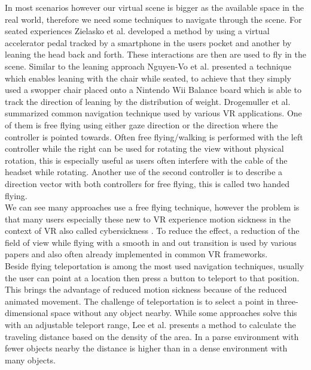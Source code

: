 In most scenarios however our virtual scene is bigger as the available space in the real world, therefore we need some techniques to navigate through the scene. For seated experiences Zielasko et al. \cite{zielasko_remain_2017} developed a method by using a virtual accelerator pedal tracked by a smartphone in the users pocket and another by leaning the head back and forth. These interactions are then are used to fly in the scene. Similar to the leaning approach Nguyen-Vo et al. \cite{nguyen-vo_simulated_2018} presented a technique which enables leaning with the chair while seated, to achieve that they simply used a swopper chair placed onto a Nintendo Wii Balance board which is able to track the direction of leaning by the distribution of weight.  
Drogemuller et al. \cite{drogemuller_examining_2020} summarized common navigation technique used by various VR applications. One of them is free flying using either gaze direction or the direction where the controller is pointed towards. Often free flying/walking is performed with the left controller while the right can be used for rotating the view without physical rotation, this is especially useful as users often interfere with the cable of the headset while rotating. Another use of the second controller is to describe a direction vector with both controllers for free flying, this is called two handed flying.\\
We can see many approaches use a free flying technique, however the problem is that many users especially these new to VR experience motion sickness in the context of VR also called cybersickness \cite{zielasko_remain_2017}.
To reduce the effect, a reduction of the field of view while flying with a smooth in and out transition is used by various papers and also often already implemented in common VR frameworks.\\
Beside flying teleportation is among the most used navigation techniques, usually the user can point at a location then press a button to teleport to that position.
This brings the advantage of reduced motion sickness because of the reduced animated movement. The challenge of teleportation is to select a point in three-dimensional space without any object nearby. While some approaches solve this with an adjustable teleport range, Lee et al. \cite{lee_evaluating_2020} presents a method to calculate the traveling distance based on the density of the area. In a parse environment with fewer objects nearby the distance is higher than in a dense environment with many objects.\\
